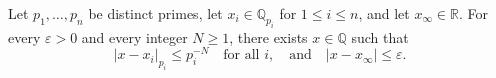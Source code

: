 Let $p_1, \ldots, p_n$ be distinct primes, let $x_i \in \mathbb{Q}_{p_i}$ for $1 \leq i \leq n$, and let $x_\infty \in \mathbb{R}$. For every $\varepsilon > 0$ and every integer $N \geq 1$, there exists $x \in \mathbb{Q}$ such that
$$|x - x_i|_{p_i} \leq p_i^{-N} \quad \text{for all } i, \quad \text{and} \quad |x - x_\infty| \leq \varepsilon.$$
